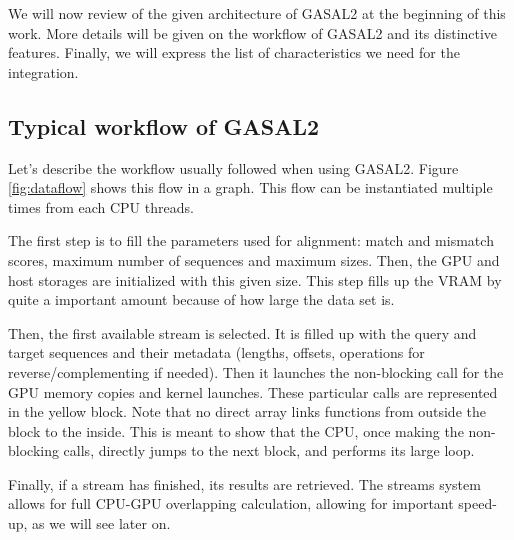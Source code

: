 We will now review of the given architecture of GASAL2 at the beginning of this work. More details will be given on the workflow of GASAL2 and its distinctive features. Finally, we will express the list of characteristics we need for the integration.


\subsection{Typical workflow of GASAL2}

Let's describe the workflow usually followed when using GASAL2. Figure \ref{fig:dataflow} shows this flow in a graph. This flow can be instantiated multiple times from each CPU threads.

The first step is to fill the parameters used for alignment: match and mismatch scores, maximum number of sequences and maximum sizes. Then, the GPU and host storages are initialized with this given size. This step fills up the VRAM by quite a important amount because of how large the data set is. 

Then, the first available stream is selected. It is filled up with the query and target sequences and their metadata (lengths, offsets, operations for reverse/complementing if needed). Then it launches the non-blocking call for the GPU memory copies and kernel launches. These particular calls are represented in the yellow block. Note that no direct array links functions from outside the block to the inside. This is meant to show that the CPU, once making the non-blocking calls, directly jumps to the next block, and performs its large loop.

Finally, if a stream has finished, its results are retrieved. The streams system allows for full CPU-GPU overlapping calculation, allowing for important speed-up, as we will see later on.

